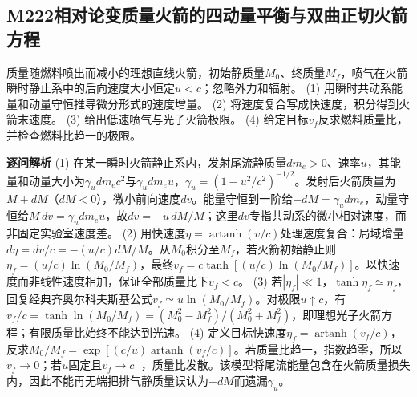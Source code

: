 \subsection*{M222\quad 相对论变质量火箭的四动量平衡与双曲正切火箭方程}
质量随燃料喷出而减小的理想直线火箭，初始静质量$M_0$、终质量$M_f$，喷气在火箭瞬时静止系中的后向速度大小恒定$u<c$；忽略外力和辐射。
(1) 用瞬时共动系能量和动量守恒推导微分形式的速度增量。
(2) 将速度复合写成快速度，积分得到火箭末速度。
(3) 给出低速喷气与光子火箭极限。
(4) 给定目标$v_f$反求燃料质量比，并检查燃料比趋一的极限。
\par\textbf{逐问解析}
(1) 在某一瞬时火箭静止系内，发射尾流静质量$dm_e>0$、速率$u$，其能量和动量大小为$\gamma_u dm_ec^2$与$\gamma_udm_eu$，$\gamma_u=(1-u^2/c^2)^{-1/2}$。发射后火箭质量为$M+dM$（$dM<0$），微小前向速度$dv$。能量守恒到一阶给$-dM=\gamma_udm_e$，动量守恒给$M\,dv=\gamma_udm_eu$，故$dv=-u\,dM/M$；这里$dv$专指共动系的微小相对速度，而非固定实验室速度差。
(2) 用快速度$\eta=\operatorname{artanh}(v/c)$处理速度复合：局域增量$d\eta=dv/c=-(u/c)dM/M$。从$M_0$积分至$M_f$，若火箭初始静止则$\eta_f=(u/c)\ln(M_0/M_f)$，最终$v_f=c\tanh[(u/c)\ln(M_0/M_f)]$。以快速度而非线性速度相加，保证全部质量比下$v_f<c$。
(3) 若$|\eta_f|\ll1$，$\tanh\eta_f\simeq\eta_f$，回复经典齐奥尔科夫斯基公式$v_f\simeq u\ln(M_0/M_f)$。对极限$u\uparrow c$，有$v_f/c=\tanh\ln(M_0/M_f)=(M_0^2-M_f^2)/(M_0^2+M_f^2)$，即理想光子火箭方程；有限质量比始终不能达到光速。
(4) 定义目标快速度$\eta_f=\operatorname{artanh}(v_f/c)$，反求$M_0/M_f=\exp[(c/u)\operatorname{artanh}(v_f/c)]$。若质量比趋一，指数趋零，所以$v_f\to0$；若$u$固定且$v_f\to c^-$，质量比发散。该模型将尾流能量包含在火箭质量损失内，因此不能再无端把排气静质量误认为$-dM$而遗漏$\gamma_u$。
\par\medskip
